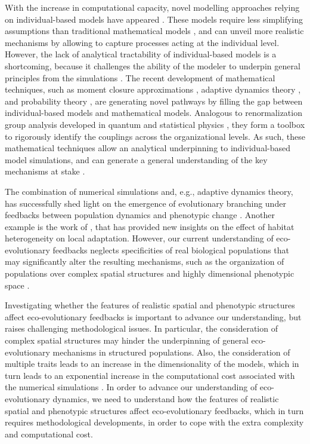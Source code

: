 With the increase in computational capacity, novel modelling approaches relying on individual-based models have appeared \citep{deangelis2005individual}. These models require less simplifying assumptions than traditional mathematical models \citep{deangelis2005individual}, and can unveil more realistic mechanisms by allowing to capture processes acting at the individual level. However, the lack of analytical tractability of individual-based models is a shortcoming, because it challenges the ability of the modeler to underpin general principles from the simulations \citep{Lion2016,May2004}.
% 
The recent development of mathematical techniques, such as moment closure approximations \citep{law1999moment,Gandhi2000,Nordbotten2020,Lion2016}, adaptive dynamics theory \citep{Metz1995}, and probability theory \citep{Champagnat2006}, are generating novel pathways by filling the gap between individual-based models and mathematical models. 
% 
Analogous to renormalization group analysis developed in quantum and statistical physics \citep{Sayama}, they form a toolbox to rigorously identify the couplings across the organizational levels. As such, these mathematical techniques allow an analytical underpinning to individual-based model simulations, and can generate a general understanding of the key mechanisms at stake \citep{Lion2016}.

The combination of numerical simulations and, e.g., adaptive dynamics theory, has successfully shed light on the emergence of evolutionary branching under feedbacks between population dynamics and phenotypic change \citep{Dieckmann1999,Doebeli2003}.
%
Another example is the work of \cite{Meszena1997,Debarre2013, Mirrahimi2020}, that has provided new insights on the effect of habitat heterogeneity on local adaptation. 
% 
However, our current understanding of eco-evolutionary feedbacks neglects specificities of real biological populations that may significantly alter the resulting mechanisms, such as the organization of populations over complex spatial structures \citep{Nowak2001a} and highly dimensional phenotypic space \citep{Doebeli2010}.

% 
Investigating whether the features of realistic spatial and phenotypic structures affect eco-evolutionary feedbacks is important to advance our understanding, but raises challenging methodological issues. 
% 
In particular, the consideration of complex spatial structures may hinder the underpinning of general eco-evolutionary mechanisms in structured populations.
% 
Also, the consideration of multiple traits leads to an increase in the dimensionality of the models, which in turn leads to an exponential increase in the computational cost associated with the numerical simulations \citep{Bellman1957}.
% 
In order to advance our understanding of eco-evolutionary dynamics, we need to understand how the features of realistic spatial and phenotypic structures affect eco-evolutionary feedbacks, which in turn requires methodological developments, in order to cope with the extra complexity and computational cost.

